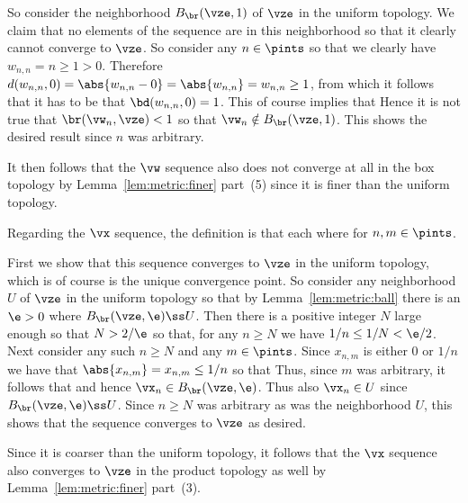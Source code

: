 {{    So consider the neighborhood $B_{\br}(\vze, 1)$ of $\vze$ in the uniform topology.
    We claim that no elements of the sequence are in this neighborhood so that it clearly cannot converge to $\vze$.
    So consider any $n \in \pints$ so that we clearly have $w_{n,n} = n \geq 1 > 0$.
    Therefore $d(w_{n,n}, 0) = \abs{w_{n,n} - 0} = \abs{w_{n,n}} = w_{n,n} \geq 1$, from which it follows that it has to be that $\bd(w_{n,n}, 0) = 1$.
    This of course implies that
    Hence it is not true that $\br(\vw_n, \vze) < 1$ so that $\vw_n \notin B_{\br}(\vze, 1)$.
    This shows the desired result since $n$ was arbitrary.

    It then follows that the $\vw$ sequence also does not converge at all in the box topology by Lemma~\ref{lem:metric:finer} part~(5) since it is finer than the uniform topology.

    Regarding the $\vx$ sequence, the definition is that each
    where
    for $n,m \in \pints$.

    First we show that this sequence converges to $\vze$ in the uniform topology, which is of course is the unique convergence point.
    So consider any neighborhood $U$ of $\vze$ in the uniform topology so that by Lemma~\ref{lem:metric:ball} there is an $\e > 0$ where $B_{\br}(\vze, \e) \ss U$.
    Then there is a positive integer $N$ large enough so that $N > 2/\e$ so that, for any $n \geq N$ we have $1/n \leq 1/N < \e/2$.
    Next consider any such $n \geq N$ and any $m \in \pints$.
    Since $x_{n,m}$ is either $0$ or $1/n$ we have that $\abs{x_{n,m}} = x_{n,m} \leq 1/n$ so that
    Thus, since $m$ was arbitrary, it follows that
    and hence $\vx_n \in B_{\br}(\vze, \e)$.
    Thus also $\vx_n \in U$ since $B_{\br}(\vze, \e) \ss U$.
    Since $n \geq N$ was arbitrary as was the neighborhood $U$, this shows that the sequence converges to $\vze$ as desired.

    Since it is coarser than the uniform topology, it follows that the $\vx$ sequence also converges to $\vze$ in the product topology as well by Lemma~\ref{lem:metric:finer} part~(3).

}}
